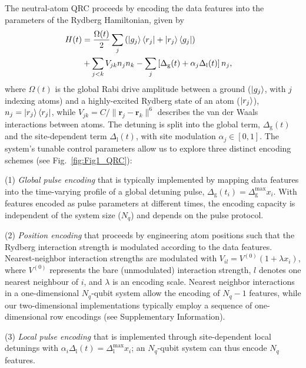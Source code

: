 \documentclass[english,floatfix,twocolumn,showpacs, aps, prx, reprint, superscriptaddress, longbibliography]{revtex4-2}
\begin{document}
The neutral-atom QRC proceeds by encoding the data features into the parameters of the Rydberg Hamiltonian, given by \cite{Wurtz2023}
\begin{align}\label{eq:RydHam}
    H(t)&=\dfrac{\Omega(t)}{2}\sum_j \left(\ket{g_j}\bra{r_j}+\ket{r_j}\bra{g_j}\right)\cr
    &+\sum_{j<k}V_{jk}n_jn_k-\sum_j \left[\Delta_{\mathrm{g}}(t) + \alpha_j\Delta_{\mathrm{l}}(t)\right] n_j,
\end{align}
where $\Omega(t)$ is the global Rabi drive amplitude between a ground ($\ket{g_j}$, with $j$ indexing atoms) and a highly-excited Rydberg state of an atom ($\ket{r_j}$), $n_j=\ket{r_j}\bra{r_j}$, while  $V_{jk}=C/\lVert\mathbf{r}_j-\mathbf{r}_k\rVert^6$ describes the van der Waals interactions between atoms. The detuning is split into the global term, $\Delta_{\mathrm{g}}(t)$ and the site-dependent term $\Delta_{\mathrm{l}}(t)$, with site modulation $\alpha_j\in[0,1]$.  The system's tunable control parameters allow us to explore three distinct encoding schemes (see Fig.~\ref{fig:Fig1_QRC}): 

(1) \emph{Global pulse encoding} that is typically implemented by mapping data features into the time-varying profile of a global detuning pulse, $\Delta_{\mathrm{g}}(t_i)=\Delta_{\mathrm{g}}^{\mathrm{max}} x_i$. With features encoded as pulse parameters at different times, the encoding capacity is independent of the system size ($N_q$) and depends on the pulse protocol.

(2) \emph{Position encoding} that proceeds by engineering atom positions such that the Rydberg interaction strength is modulated according to the data features. Nearest-neighbor interaction strengths are modulated with $V_{il}=V^{(0)}(1+\lambda x_i)$, where $V^{(0)}$ represents the bare (unmodulated) interaction strength,  $l$ denotes one nearest neighbour of $i$, and $\lambda$ is an encoding scale. Nearest neighbor interactions in a one-dimensional $N_q$-qubit system allow the encoding of $N_q-1$ features, while our two-dimensional implementations typically employ a sequence of one-dimensional row encodings (see Supplementary Information).

(3) \emph{Local pulse encoding} that is implemented through site-dependent local detunings with $\alpha_i\Delta_{\mathrm{l}}(t)=\Delta_{\mathrm{l}}^{\mathrm{max}} x_i$; an $N_q$-qubit system can thus encode $N_q$ features.
\end{document}

